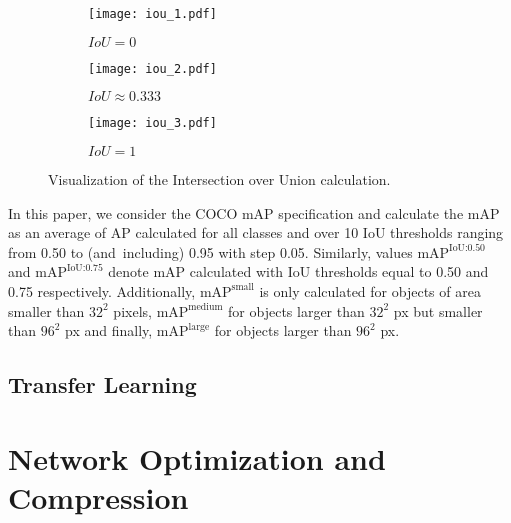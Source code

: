 \begin{figure}[h]
    \centering
    \begin{subfigure}[b]{0.3125\textwidth}
        \texttt{[image: iou\_1.pdf]}
        \caption{$IoU = 0$}
    \end{subfigure}
    \hfill
    \begin{subfigure}[b]{0.2272727\textwidth}
        \texttt{[image: iou\_2.pdf]}
        \caption{$IoU \approx 0.333$}
    \end{subfigure}
    \hfill
    \begin{subfigure}[b]{0.15151515\textwidth}
        \texttt{[image: iou\_3.pdf]}
        \caption{$IoU = 1$}
    \end{subfigure}

    \caption{Visualization of the Intersection over Union calculation.}
    \label{IoU}
\end{figure}

In this paper, we consider the COCO mAP specification and calculate the mAP as
an average of AP calculated for all classes and over 10 IoU thresholds ranging
from \num{0.50} to (and~including) \num{0.95} with step \num{0.05}. Similarly,
values $\text{mAP}^{\text{IoU:0.50}}$ and $\text{mAP}^{\text{IoU:0.75}}$ denote
mAP calculated with IoU thresholds equal to \num{0.50} and \num{0.75}
respectively. Additionally, $\text{mAP}^{\text{small}}$ is only calculated for
objects of area smaller than $32^2$ pixels, $\text{mAP}^{\text{medium}}$ for
objects larger than $32^2$ px but smaller than $96^2$ px and finally,
$\text{mAP}^{\text{large}}$ for objects larger than $96^2$ px.


\subsection{Transfer Learning}




\section{Network Optimization and Compression}

